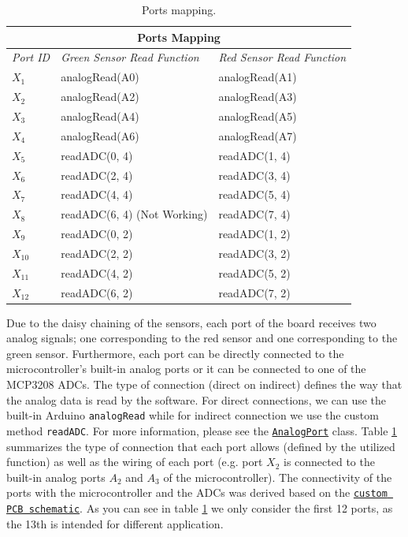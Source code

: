 \begin{table}
    \centering
    \begin{tabular}{ |p{2cm}||p{5cm}|p{5cm}|  }
        \hline
        \multicolumn{3}{|c|}{\textbf{Ports Mapping}} \\
        \hline
        \textit{Port ID}& \textit{Green Sensor Read Function} & \textit{Red Sensor Read Function}\\
        \hline
        $X_{1}$ & analogRead(A0) & analogRead(A1)\\
        \hline
        $X_{2}$ & analogRead(A2) & analogRead(A3)\\
        \hline
        $X_{3}$ & analogRead(A4) & analogRead(A5)\\
        \hline
        $X_{4}$ & analogRead(A6) & analogRead(A7)\\
        \hline
        $X_{5}$ & readADC(0, 4) & readADC(1, 4)\\
        \hline
        $X_{6}$ & readADC(2, 4) & readADC(3, 4)\\
        \hline
        $X_{7}$ & readADC(4, 4) & readADC(5, 4)\\
        \hline
        $X_{8}$ & readADC(6, 4) (Not Working) & readADC(7, 4)\\
        \hline
        $X_{9}$ & readADC(0, 2) & readADC(1, 2)\\
        \hline
        $X_{10}$ & readADC(2, 2) & readADC(3, 2)\\
        \hline
        $X_{11}$ & readADC(4, 2) & readADC(5, 2)\\
        \hline
        $X_{12}$ & readADC(6, 2) & readADC(7, 2)\\
        \hline
    \end{tabular}
    \caption{\label{tab:arduino_mapping}Ports mapping.}
\end{table}

Due to the daisy chaining of the sensors, each port of the board receives two
analog signals; one corresponding to the red sensor and one corresponding to the 
green sensor. Furthermore, each port can be directly connected to the 
microcontroller's built-in analog ports or it can be connected to one of the 
MCP3208 ADCs. The type of connection (direct on indirect) 
defines the way that the analog data is read by the software.
For direct connections, we can use the built-in Arduino \texttt{analogRead} 
while for indirect connection we use the custom method \texttt{readADC}.
For more information, please see the
\texttt{\href{https://amartsop.github.io/Exoskeleton/classAnalogPort.html}{AnalogPort}}
class. 
Table \ref{tab:arduino_mapping} summarizes the type of connection that 
each port allows (defined by the utilized function) as well as the wiring 
of each port (e.g. port $X_{2}$ is connected to the built-in analog ports
$A_{2}$ and $A_{3}$ of the microcontroller). The connectivity of 
the ports with the microcontroller and the ADCs was derived based on 
the \texttt{\href{https://tinyurl.com/53urrcvm}{custom PCB schematic}}.
As you can see in table \ref{tab:arduino_mapping} we only consider the 
first 12 ports, as the 13th is intended for different application.


